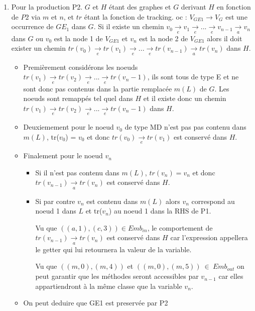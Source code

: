 \documentclass[a4paper, 12pt]{article}
\begin{document}
\begin{enumerate}
    \item Pour la production P2. $G$ et $H$ étant des graphes et $G$ derivant $H$ en fonction de $P2$ via $m$ et $n$, et $tr$ étant la fonction de tracking.
    oc :  \( {V_{GE1}} {\rightarrow} {V_G} \) est une occurrence de {$GE_1$} dans $G$.
    Si il existe un chemin \( {v_0} \underset{e}{\rightarrow} {v_1} \underset{e}{\rightarrow} ... \underset{e}{\rightarrow} v_{n-1} \underset{a}{\rightarrow} {v_n} \) dans $G$
    ou {$v_0$} est la node 1 de $V_{GE1}$ et $v_n$ est la node 2 de $V_{GE1}$
    alors il doit exister un chemin \( tr(v_0) \underset{e}{\rightarrow} tr(v_1) \underset{e}{\rightarrow} ... \underset{e}{\rightarrow} tr(v_{n-1}) \underset{a}{\rightarrow} tr({v_n}) \) dans $H$.
    \begin{itemize}[label=\textbullet]
      \item Premièrement considérons les noeuds $tr(v_1) \underset{e}{\rightarrow} tr(v_2) \underset{e}{\rightarrow} ... \underset{e}{\rightarrow} tr(v_n-1)$,
      ils sont tous de type E et ne sont donc pas contenus dans la partie remplacée $m(L)$ de $G$.
      Les noeuds sont remappés tel quel dans $H$ et il existe donc un chemin $tr(v_1) \underset{e}{\rightarrow} tr(v_2) \underset{e}{\rightarrow} ... \underset{e}{\rightarrow} tr(v_n-1)$ dans $H$.

      \item Deuxiemement pour le noeud {$v_0$} de type MD n'est pas pas contenu dans $m(L)$, tr({$v_0$}) = {$v_0$} et donc $tr({v_0}) \underset{e}{\rightarrow} tr({v_1})$ est conservé dans $H$.

      \item  Finalement pour le noeud {$v_n$}
      \begin{itemize}
      \item Si il n'est pas contenu dans $m(L)$, $tr(v_n)= v_n$ et donc $tr(v_{n-1}) \underset{a}{\rightarrow} tr(v_n)$ est conservé dans $H$.
      \item Si par contre {$v_n$} est contenu dans $m(L)$ alors {$v_n$} correspond au noeud 1 dans $L$ et tr($v_n$) au noeud 1 dans la RHS de P1.

      Vu que $((a,1),(c,3)) \in Emb_{in}$, le comportement de $tr(v_{n-1}) \underset{a}{\rightarrow} tr(v_n)$ est conservé dans $H$ car l'expression appellera le getter qui lui retournera la valeur de la variable.

      Vu que $((m,0),(m,4))$ et $((m,0),(m,5))~\in~Emb_{out}$ on peut garantir que les méthodes seront accessibles par $v_{n-1}$ car elles appartiendront à la même classe que la variable $v_n$.
      \end{itemize}
      \item On peut deduire que GE1 est preservée par P2
    \end{itemize}

  \end{enumerate}
\end{document}
